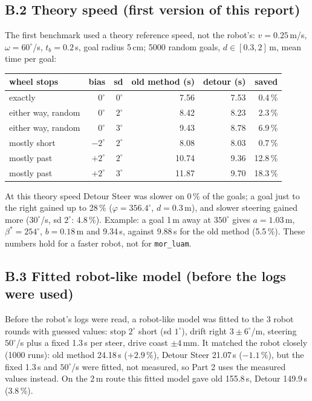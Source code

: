 \documentclass[11pt,a4paper]{article}
\begin{document}
\subsection*{B.2 Theory speed (first version of this report)}
The first benchmark used a theory reference speed, not the robot's: $v = 0.25$\,m/s, $\omega = 60^\circ$/s,
$t_b = 0.2$\,s, goal radius 5\,cm; 5000 random goals, $d \in [0.3, 2]$\,m, mean time per goal:
\begin{center}
\begin{tabular}{lrrrrr}
\toprule
wheel stops & bias & sd & old method (s) & detour (s) & saved \\
\midrule
exactly             & $0^\circ$  & $0^\circ$ &  7.56 & 7.53 &  0.4\,\% \\
either way, random  & $0^\circ$  & $2^\circ$ &  8.42 & 8.23 &  2.3\,\% \\
either way, random  & $0^\circ$  & $3^\circ$ &  9.43 & 8.78 &  6.9\,\% \\
mostly short        & $-2^\circ$ & $2^\circ$ &  8.08 & 8.03 &  0.7\,\% \\
mostly past         & $+2^\circ$ & $2^\circ$ & 10.74 & 9.36 & 12.8\,\% \\
mostly past         & $+2^\circ$ & $3^\circ$ & 11.87 & 9.70 & 18.3\,\% \\
\bottomrule
\end{tabular}
\end{center}
At this theory speed Detour Steer was slower on 0\,\% of the goals; a goal just to the right gained up to
28\,\% ($\varphi = 356.4^\circ$, $d = 0.3$\,m), and slower steering gained more ($30^\circ$/s, sd $2^\circ$: 4.8\,\%).
Example: a goal 1\,m away at $350^\circ$ gives $a = 1.03$\,m, $\beta^\ast = 254^\circ$, $b = 0.18$\,m and 9.34\,s,
against 9.88\,s for the old method (5.5\,\%). These numbers hold for a faster robot, not for \texttt{mor\_luam}.

\subsection*{B.3 Fitted robot-like model (before the logs were used)}
Before the robot's logs were read, a robot-like model was fitted to the 3 robot rounds with guessed values:
stop $2^\circ$ short (sd $1^\circ$), drift right $3 \pm 6^\circ$/m, steering $50^\circ$/s plus a fixed 1.3\,s per steer,
drive coast $\pm 4$\,mm. It matched the robot closely (1000 runs): old method 24.18\,s ($+2.9\,\%$), Detour Steer
21.07\,s ($-1.1\,\%$), but the fixed 1.3\,s and $50^\circ$/s were fitted, not measured, so Part 2 uses the
measured values instead. On the 2\,m route this fitted model gave old 155.8\,s, Detour 149.9\,s (3.8\,\%).
\end{document}
